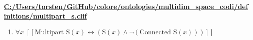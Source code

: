 \documentclass{article}
\begin{document}
\textbf{\url{C:/Users/torsten/GitHub/colore/ontologies/multidim\_space\_codi/definitions/multipart\_s.clif}}

\begin{enumerate}
\item $\forall x\;  \left[ \left[ \textrm{Multipart\_S}(x) \leftrightarrow \left(\textrm{S}(x) \land \neg \left(\textrm{Connected\_S}(x)\right)\right) \right] \right]$
\end{enumerate}
\end{document}

